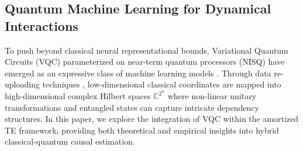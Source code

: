 \subsection{Quantum Machine Learning for Dynamical Interactions}
To push beyond classical neural representational bounds, Variational Quantum Circuits (VQC) parameterized on near-term quantum processors (NISQ) have emerged as an expressive class of machine learning models \cite{bergholm2018pennylane}. Through data re-uploading techniques \cite{perez2020data}, low-dimensional classical coordinates are mapped into high-dimensional complex Hilbert spaces $\mathbb{C}^{2^n}$ where non-linear unitary transformations and entangled states can capture intricate dependency structures. In this paper, we explore the integration of VQC within the amortized TE framework, providing both theoretical and empirical insights into hybrid classical-quantum causal estimation.
